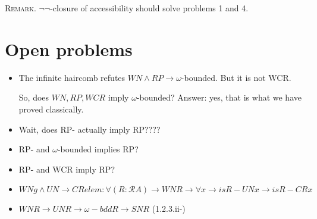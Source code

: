 \documentclass{scrartcl}
\begin{document}
\textsc{Remark.}
$\lnot\lnot$-closure of accessibility should solve problems 1 and 4.

\section{Open problems}

\begin{itemize}
  \item The infinite haircomb refutes $WN \land RP \to \omega$-bounded.  But it is not WCR.

  So, does $WN, RP, WCR$ imply $\omega$-bounded?
  Answer: yes, that is what we have proved classically.

  \item Wait, does RP- actually imply RP????

  \item RP- and $\omega$-bounded implies RP?
  \item RP- and WCR imply RP?
  \item
  \[ WNg \land UN \to CRelem :
  \forall (R : \mathscr{R} A) \to WN R \to \forall x \to is R -UN x \to is R -CR x \]
  \item $WN R \to UN R \to \omega-bdd R \to SN R$ (1.2.3.ii-)
\end{itemize}
\end{document}
